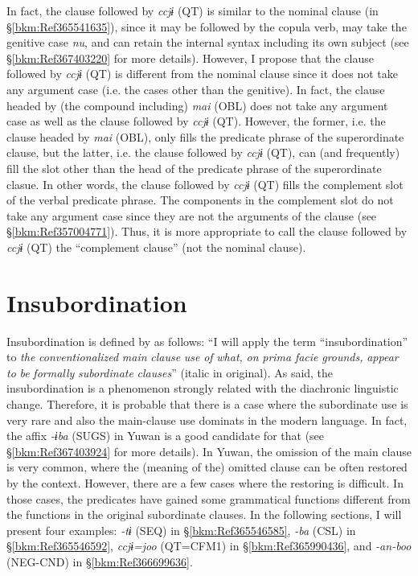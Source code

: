 In fact, the clause followed by \textit{ccjɨ} (QT) is similar to the nominal clause (in §\ref{bkm:Ref365541635}), since it may be followed by the copula verb, may take the genitive case \textit{nu}, and can retain the internal syntax including its own subject (see §\ref{bkm:Ref367403220} for more details). However, I propose that the clause followed by \textit{ccjɨ} (QT) is different from the nominal clause since it does not take any argument case (i.e. the cases other than the genitive). In fact, the clause headed by (the compound including) \textit{mai} (OBL) does not take any argument case as well as the clause followed by \textit{ccjɨ} (QT). However, the former, i.e. the clause headed by \textit{mai} (OBL), only fills the predicate phrase of the superordinate clause, but the latter, i.e. the clause followed by \textit{ccjɨ} (QT), can (and frequently) fill the slot other than the head of the predicate phrase of the superordinate clasue. In other words, the clause followed by \textit{ccjɨ} (QT) fills the complement slot of the verbal predicate phrase. The components in the complement slot do not take any argument case since they are not the arguments of the clause (see §\ref{bkm:Ref357004771}). Thus, it is more appropriate to call the clause followed by \textit{ccjɨ} (QT) the “complement clause” (not the nominal clause).

\section{Insubordination}
\label{bkm:Ref365191910}\hypertarget{RefHeadingToc395697256}{}
Insubordination is defined by \citet[367]{Evans2007} as follows: “I will apply the term “insubordination” to \textit{the} \textit{conventionalized} \textit{main} \textit{clause} \textit{use} \textit{of} \textit{what,} \textit{on} \textit{prima} \textit{facie} \textit{grounds,} \textit{appear} \textit{to} \textit{be} \textit{formally} \textit{subordinate} \textit{clauses}” (italic in original). As \citet[367]{Evans2007} said, the insubordination is a phenomenon strongly related with the diachronic linguistic change. Therefore, it is probable that there is a case where the subordinate use is very rare and also the main-clause use dominats in the modern language. In fact, the affix \textit{{}-ɨba} (SUGS) in Yuwan is a good candidate for that (see §\ref{bkm:Ref367403924} for more details). In Yuwan, the omission of the main clause is very common, where the (meaning of the) omitted clause can be often restored by the context. However, there are a few cases where the restoring is difficult. In those cases, the predicates have gained some grammatical functions different from the functions in the original subordinate clauses. In the following sections, I will present four examples: \textit{-tɨ} (SEQ) in §\ref{bkm:Ref365546585}, \textit{{}-ba} (CSL) in §\ref{bkm:Ref365546592}, \textit{ccjɨ=joo} (QT=CFM1) in §\ref{bkm:Ref365990436}, and \textit{{}-an-boo} (NEG-CND) in §\ref{bkm:Ref366699636}.

